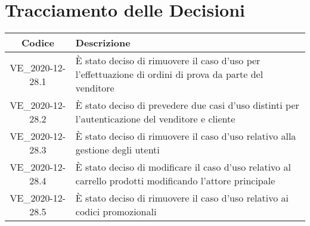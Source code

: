 \section*{Tracciamento delle Decisioni}

\begin{center}
	\begin{longtable}{|c|p{14.5cm}|}
	\hline
	\rowcolor{lighter-grayer}
	\textbf{Codice} & \textbf{Descrizione} \\
	\hline
	\endfirsthead

	\hline
	VE\_2020-12-28.1 & È stato deciso di rimuovere il caso d'uso per l'effettuazione di ordini di prova da parte del venditore \\
	\hline
	\hline
	VE\_2020-12-28.2 & È stato deciso di prevedere due casi d'uso distinti per l'autenticazione del venditore e cliente \\
	\hline
	\hline
	VE\_2020-12-28.3 & È stato deciso di rimuovere il caso d'uso relativo alla gestione degli utenti\\
	\hline
	\hline
	VE\_2020-12-28.4 & È stato deciso di modificare il caso d'uso relativo al carrello prodotti modificando l'attore principale\\
	\hline
	\hline
	VE\_2020-12-28.5 & È stato deciso di rimuovere il caso d'uso relativo ai codici promozionali \\
	\hline


	\end{longtable}
\end{center}